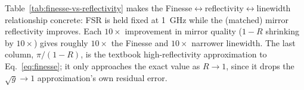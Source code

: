 \documentclass[9pt]{article}
\begin{document}
Table~\ref{tab:finesse-vs-reflectivity} makes the Finesse$\leftrightarrow$reflectivity$\leftrightarrow$linewidth
relationship concrete: FSR is held fixed at \SI{1}{\giga\hertz} while the
(matched) mirror reflectivity improves. Each $10\times$ improvement in mirror
quality ($1-R$ shrinking by $10\times$) gives roughly $10\times$ the Finesse
and $10\times$ narrower linewidth. The last column,
$\pi/(1-R)$, is the textbook high-reflectivity approximation to
Eq.~\eqref{eq:finesse}; it only approaches the exact value as $R\to1$, since
it drops the $\sqrt{g}\to1$ approximation's own residual error.
\begin{table}[H]
\centering

\caption{Finesse and linewidth vs. matched mirror power reflectivity $R$, at
fixed $\mathrm{FSR}=\SI{1}{\giga\hertz}$. Generated by
\textit{generateReportFigures.m} (\textit{exportFinesseTable}) directly from
\textit{OpticalCavity}, so it can never silently drift from the code.}
\label{tab:finesse-vs-reflectivity}
\end{table}
\end{document}
